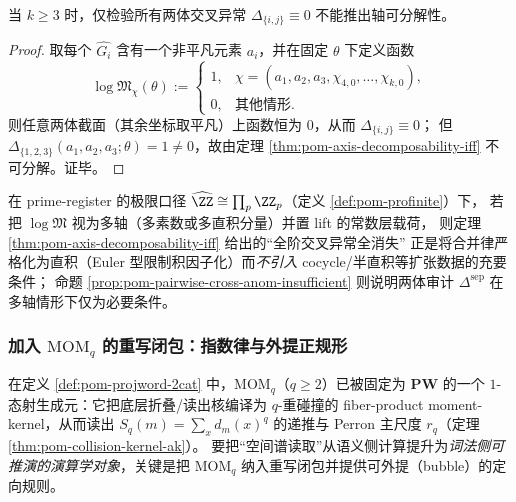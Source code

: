 \begin{proposition}\label{prop:pom-pairwise-cross-anom-insufficient}
当 \(k\ge 3\) 时，仅检验所有两体交叉异常 \(\Delta_{\{i,j\}}\equiv 0\) 不能推出轴可分解性。
\end{proposition}
\begin{proof}
取每个 \(\widehat{G_i}\) 含有一个非平凡元素 \(a_i\)，并在固定 \(\theta\) 下定义函数
\[
\log\mathfrak{M}_{\chi}(\theta):=
\begin{cases}
1, & \chi=(a_1,a_2,a_3,\chi_{4,0},\dots,\chi_{k,0}),\\
0, & \text{其他情形}.
\end{cases}
\]
则任意两体截面（其余坐标取平凡）上函数恒为 \(0\)，从而 \(\Delta_{\{i,j\}}\equiv 0\)；
但 \(\Delta_{\{1,2,3\}}(a_1,a_2,a_3;\theta)=1\neq 0\)，故由定理 \ref{thm:pom-axis-decomposability-iff} 不可分解。证毕。
\end{proof}

\begin{remark}\label{rem:pom-higher-cross-anom-euler}
在 prime-register 的极限口径 \(\widehat{\ZZ}\cong\prod_p\ZZ_p\)（定义 \ref{def:pom-profinite}）下，
若把 \(\log\mathfrak{M}\) 视为多轴（多素数或多直积分量）并置 lift 的常数层载荷，
则定理 \ref{thm:pom-axis-decomposability-iff} 给出的“全阶交叉异常全消失”
正是将合并律严格化为直积（Euler 型限制积因子化）而\emph{不引入} cocycle/半直积等扩张数据的充要条件；
命题 \ref{prop:pom-pairwise-cross-anom-insufficient} 则说明两体审计 \(\Delta^{\mathrm{sep}}\) 在多轴情形下仅为必要条件。
\end{remark}

\subsubsection{加入 \texorpdfstring{$\mathrm{MOM}_q$}{MOMq} 的重写闭包：指数律与外提正规形}\label{subsec:pom-mom-rewrite-normal}

在定义 \ref{def:pom-projword-2cat} 中，\(\mathrm{MOM}_q\)（\(q\ge 2\)）已被固定为 \(\mathbf{PW}\) 的一个 \(1\)-态射生成元：它把底层折叠/读出核编译为 \(q\)-重碰撞的 fiber-product moment-kernel，从而读出 \(S_q(m)=\sum_x d_m(x)^q\) 的递推与 Perron 主尺度 \(r_q\)（定理 \ref{thm:pom-collision-kernel-ak}）。
要把“空间谱读取”从语义侧计算提升为\emph{词法侧可推演的演算学对象}，关键是把 \(\mathrm{MOM}_q\) 纳入重写闭包并提供可外提（bubble）的定向规则。

